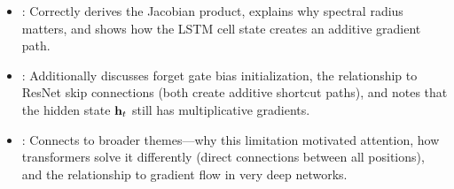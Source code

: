 \begin{interviewq}
\goodgreat
\begin{itemize}
\item {}: Correctly derives the Jacobian product, explains
  why spectral radius matters, and shows how the LSTM cell state creates
  an additive gradient path.
\item {}: Additionally discusses forget gate bias
  initialization, the relationship to ResNet skip connections (both create
  additive shortcut paths), and notes that the hidden state $\mathbf{h}_t$ still
  has multiplicative gradients.
\item {}: Connects to broader themes---why this limitation
  motivated attention, how transformers solve it differently (direct
  connections between all positions), and the relationship to gradient
  flow in very deep networks.
\end{itemize}

\end{interviewq}

